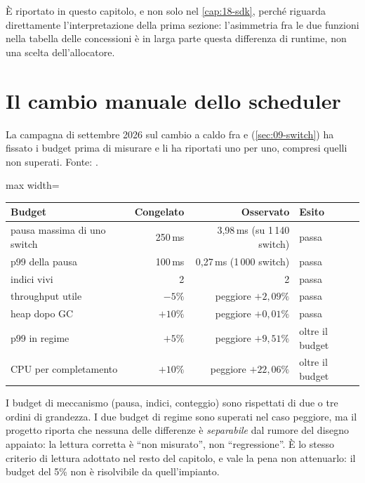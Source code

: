 \`E riportato in questo capitolo, e non solo nel \cref{cap:18-sdk}, perch\'e
riguarda direttamente l'interpretazione della prima sezione: l'asimmetria fra le
due funzioni nella tabella delle concessioni \`e in larga parte questa
differenza di runtime, non una scelta dell'allocatore.

\section{Il cambio manuale dello scheduler}
\label{sec:25-switch}

La campagna di settembre 2026 sul cambio a caldo fra  e
 (\cref{sec:09-switch}) ha fissato i budget prima di misurare e
li ha riportati uno per uno, compresi quelli non superati. Fonte:
.

\begin{center}
\small
\begin{adjustbox}{max width=\textwidth}
\begin{tabular}{@{}lrrl@{}}
\toprule
\textbf{Budget} & \textbf{Congelato} & \textbf{Osservato} & \textbf{Esito} \\
\midrule
pausa massima di uno switch & 250\,ms & 3{,}98\,ms (su 1\,140 switch) & passa \\
p99 della pausa & 100\,ms & 0{,}27\,ms (1\,000 switch) & passa \\
indici vivi & 2 & 2 & passa \\
throughput utile & $-5\%$ & peggiore $+2{,}09\%$ & passa \\
heap dopo GC & $+10\%$ & peggiore $+0{,}01\%$ & passa \\
p99 in regime & $+5\%$ & peggiore $+9{,}51\%$ & oltre il budget \\
CPU per completamento & $+10\%$ & peggiore $+22{,}06\%$ & oltre il budget \\
\bottomrule
\end{tabular}
\end{adjustbox}
\end{center}

I budget di meccanismo (pausa, indici, conteggio) sono rispettati di due o tre
ordini di grandezza. I due budget di regime sono superati nel caso peggiore, ma
il progetto riporta che nessuna delle differenze \`e \emph{separabile} dal
rumore del disegno appaiato: la lettura corretta \`e ``non misurato'', non
``regressione''. \`E lo stesso criterio di lettura adottato nel resto del
capitolo, e vale la pena non attenuarlo: il budget del 5\% non \`e risolvibile
da quell'impianto.

